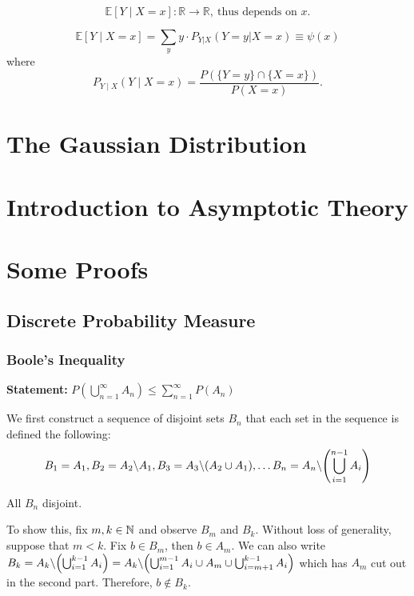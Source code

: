 \begin{prf}
\[
\mathbb{E}[Y \mid X = x]: \mathbb{R} \to \mathbb{R}, \ \text{thus depends on } x.
\]
\begin{clm}
\[
\mathbb{E}[Y \mid X = x] = \sum_y y \cdot P_{Y|X}(Y=y|X=x)\equiv \psi(x)
\]
where
\[
P_{Y \mid X}(Y \mid X = x) = \frac{P(\{Y = y\} \cap \{X = x\})}{P(X = x)}.
\]
\end{clm}

\newpage
\section{The Gaussian Distribution}


\newpage
\section{Introduction to Asymptotic Theory}

\newpage
\appendix
\section{Some Proofs}
\subsection{Discrete Probability Measure}
\subsubsection{Boole's Inequality}
\label{proof: boole}
\textbf{Statement:}
$P\left(\bigcup_{n=1}^\infty A_n\right)\leq\sum_{n=1}^\infty P(A_n)$

\begin{prf*}
We first construct a sequence of disjoint sets $B_n$ that each set in the sequence is defined the following: 
$$B_1 = A_1, B_2 = A_2 \backslash A_1, B_3 = A_3\backslash (A_2\cup A_1), \dots B_n = A_n \backslash \qty(\bigcup_{i=1}^{n-1}A_i)$$ 
\begin{clm}
All $B_n$ disjoint.
\end{clm}

To show this, fix $m, k\in \mathbb{N}$ and observe $B_m$ and $B_k$. Without loss of generality, suppose that $m<k$. Fix $b\in B_m$, then $b\in A_m$. We can also write $B_k = A_k \backslash \qty(\bigcup_{i=1}^{k-1}A_i) = A_k \backslash \qty(\bigcup_{i=1}^{m-1}A_i \cup A_m \cup \bigcup_{i=m+1}^{k-1}A_i)$ which has $A_m$ cut out in the second part. Therefore, $b\notin B_k$. \\


\end{prf*}
\end{prf}
